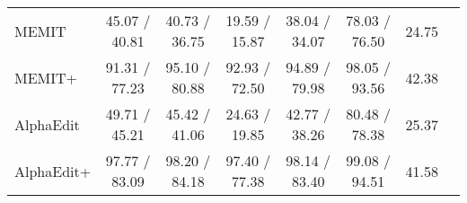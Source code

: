 \begin{table*}[h]
{\begin{tabular}{l cccc ccc}
        MEMIT       & 45.07 / 40.81  & 40.73 / 36.75  & 19.59 / 15.87  & 38.04 / 34.07  & 78.03 / 76.50    & 24.75 \\
        MEMIT+      & 91.31 / 77.23  & 95.10 / 80.88  & 92.93 / 72.50  & 94.89 / 79.98  & 98.05 / 93.56    & 42.38 \\
        AlphaEdit   & 49.71 / 45.21  & 45.42 / 41.06  & 24.63 / 19.85  & 42.77 / 38.26  & 80.48 / 78.38    & 25.37 \\
        AlphaEdit+  & 97.77 / 83.09  & 98.20 / 84.18  & 97.40 / 77.38  & 98.14 / 83.40  & 99.08 / 94.51    & 41.58 \\
        \bottomrule
    \end{tabular}
    }
    
\end{table*}

\begin{table*}[h]
\caption{Performance comparison in AKEW (Counterfact). The `+' symbol indicates results incorporating AnyEdit's autoregressive editing paradigm. The left side of `/` represents the LLM's edited output for original questions, while the right side represents the edited output for paraphrase questions.}
    \label{tab:app_2}
    \centering
    \renewcommand{\arraystretch}{1.2}
    \setlength{\tabcolsep}{4pt}
\end{table*}
